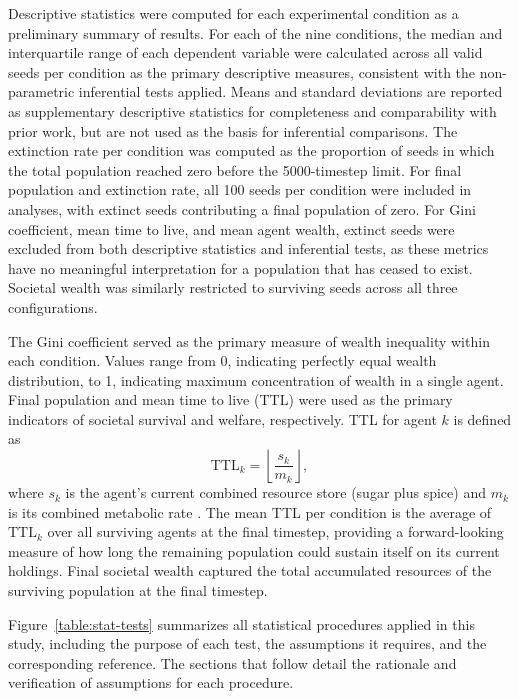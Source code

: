\documentclass{icsthesis}
\begin{document}
\begin{mainmatter}
			Descriptive statistics were computed for each experimental condition as a preliminary summary of results. For each of the nine conditions, the median and interquartile range of each dependent variable were calculated across all valid seeds per condition as the primary descriptive measures, consistent with the non-parametric inferential tests applied. Means and standard deviations are reported as supplementary descriptive statistics for completeness and comparability with prior work, but are not used as the basis for inferential comparisons. The extinction rate per condition was computed as the proportion of seeds in which the total population reached zero before the 5000-timestep limit. For final population and extinction rate, all 100 seeds per condition were included in analyses, with extinct seeds contributing a final population of zero. For Gini coefficient, mean time to live, and mean agent wealth, extinct seeds were excluded from both descriptive statistics and inferential tests, as these metrics have no meaningful interpretation for a population that has ceased to exist. Societal wealth was similarly restricted to surviving seeds across all three configurations.

			The Gini coefficient \citep{Gini1912} served as the primary measure of wealth inequality within each condition. Values range from 0, indicating perfectly equal wealth distribution, to 1, indicating maximum concentration of wealth in a single agent. Final population and mean time to live (TTL) were used as the primary indicators of societal survival and welfare, respectively. TTL for agent $k$ is defined as
			\begin{equation}
				\text{TTL}_k = \left\lfloor \frac{s_k}{m_k} \right\rfloor,
			\end{equation}
			where $s_k$ is the agent's current combined resource store (sugar plus spice) and $m_k$ is its combined metabolic rate \citep{Kehoe2015}. The mean TTL per condition is the average of $\text{TTL}_k$ over all surviving agents at the final timestep, providing a forward-looking measure of how long the remaining population could sustain itself on its current holdings. Final societal wealth captured the total accumulated resources of the surviving population at the final timestep.

			Figure~\ref{table:stat-tests} summarizes all statistical procedures applied in this study, including the purpose of each test, the assumptions it requires, and the corresponding reference. The sections that follow detail the rationale and verification of assumptions for each procedure.


\end{mainmatter}
\end{document}
